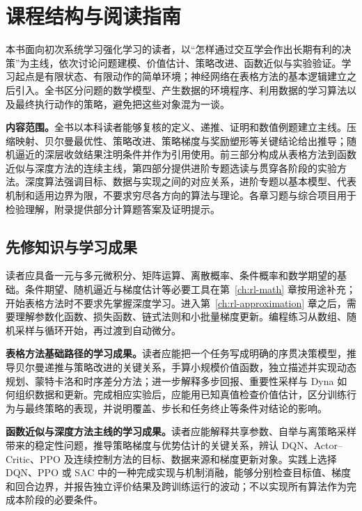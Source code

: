 \chapter*{课程结构与阅读指南}

本书面向初次系统学习强化学习的读者，以“怎样通过交互学会作出长期有利的决策”为主线，依次讨论问题建模、价值估计、策略改进、函数近似与实验验证。学习起点是有限状态、有限动作的简单环境；神经网络在表格方法的基本逻辑建立之后引入。全书区分问题的数学模型、产生数据的环境程序、利用数据的学习算法以及最终执行动作的策略，避免把这些对象混为一谈。

\textbf{内容范围。}全书以本科读者能够复核的定义、递推、证明和数值例题建立主线。压缩映射、贝尔曼最优性、策略改进、策略梯度与奖励塑形等关键结论给出推导；随机逼近的深层收敛结果注明条件并作为引用使用。前三部分构成从表格方法到函数近似与深度方法的连续主线，第四部分提供进阶专题选读与贯穿各阶段的实验方法。深度算法强调目标、数据与实现之间的对应关系，进阶专题以基本模型、代表机制和适用边界为限，不要求穷尽各方向的算法与理论。各章习题与综合项目用于检验理解，附录提供部分计算题答案及证明提示。

\section*{先修知识与学习成果}

读者应具备一元与多元微积分、矩阵运算、离散概率、条件概率和数学期望的基础。条件期望、随机逼近与梯度估计等必要工具在第~\ref{ch:rl-math} 章按用途补充；开始表格方法时不要求先掌握深度学习。进入第~\ref{ch:rl-approximation} 章之后，需要理解参数化函数、损失函数、链式法则和小批量梯度更新。编程练习从数组、随机采样与循环开始，再过渡到自动微分。

\textbf{表格方法基础路径的学习成果。}读者应能把一个任务写成明确的序贯决策模型，推导贝尔曼递推与策略改进的关键关系，手算小规模价值函数，独立描述并实现动态规划、蒙特卡洛和时序差分方法；进一步解释多步回报、重要性采样与 Dyna 如何组织数据和更新。完成相应实验后，应能用已知真值检查价值估计，区分训练行为与最终策略的表现，并说明覆盖、步长和任务终止等条件对结论的影响。

\textbf{函数近似与深度方法主线的学习成果。}读者应能解释共享参数、自举与离策略采样带来的稳定性问题，推导策略梯度与优势估计的关键关系，辨认 DQN、Actor--Critic、PPO 及连续控制方法的目标、数据来源和梯度更新对象。实践上选择 DQN、PPO 或 SAC 中的一种完成实现与机制消融，能够分别检查目标值、梯度和回合边界，并报告独立评价结果及跨训练运行的波动；不以实现所有算法作为完成本阶段的必要条件。

